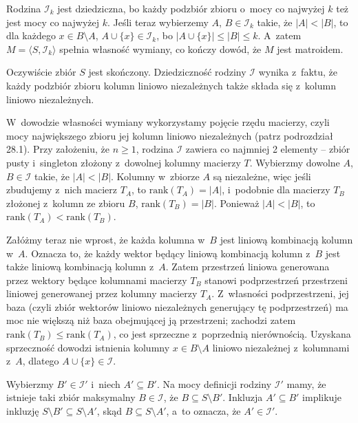 
\exercise %
Rodzina $\mathcal{I}_k$ jest dziedziczna, bo każdy podzbiór zbioru o~mocy co najwyżej $k$ też jest mocy co najwyżej $k$.
Jeśli teraz wybierzemy $A$, $B\in\mathcal{I}_k$ takie, że $|A|<|B|$, to dla każdego $x\in B\setminus A$, $A\cup\{x\}\in\mathcal{I}_k$, bo $|A\cup\{x\}|\le|B|\le k$.
A~zatem $M=\langle S,\mathcal{I}_k\rangle$ spełnia własność wymiany, co kończy dowód, że $M$ jest matroidem.

\exercise %

\noindent Oczywiście zbiór $S$ jest skończony.
Dziedziczność rodziny $\mathcal{I}$ wynika z~faktu, że każdy podzbiór zbioru kolumn liniowo niezależnych także składa się z~kolumn liniowo niezależnych.

W~dowodzie własności wymiany wykorzystamy pojęcie rzędu macierzy, czyli mocy największego zbioru jej kolumn liniowo niezależnych (patrz podrozdział 28.1).
Przy założeniu, że $n\ge1$, rodzina $\mathcal{I}$ zawiera co najmniej 2 elementy -- zbiór pusty i~singleton złożony z~dowolnej kolumny macierzy $T$.
Wybierzmy dowolne $A$, $B\in\mathcal{I}$ takie, że $|A|<|B|$.
Kolumny w~zbiorze $A$ są niezależne, więc jeśli zbudujemy z~nich macierz $T_A$, to $\mathrm{rank}(T_A)=|A|$, i~podobnie dla macierzy $T_B$ złożonej z~kolumn ze zbioru $B$, $\mathrm{rank}(T_B)=|B|$.
Ponieważ $|A|<|B|$, to $\mathrm{rank}(T_A)<\mathrm{rank}(T_B)$.

Załóżmy teraz nie wprost, że każda kolumna w~$B$ jest liniową kombinacją kolumn w~$A$.
Oznacza to, że każdy wektor będący liniową kombinacją kolumn z~$B$ jest także liniową kombinacją kolumn z~$A$.
Zatem przestrzeń liniowa generowana przez wektory będące kolumnami macierzy $T_B$ stanowi podprzestrzeń przestrzeni liniowej generowanej przez kolumny macierzy $T_A$.
Z~własności podprzestrzeni, jej baza (czyli zbiór wektorów liniowo niezależnych generujący tę podprzestrzeń) ma moc nie większą niż baza obejmującej ją przestrzeni; zachodzi zatem $\mathrm{rank}(T_B)\le\mathrm{rank}(T_A)$, co jest sprzeczne z~poprzednią nierównością.
Uzyskana sprzeczność dowodzi istnienia kolumny $x\in B\setminus A$ liniowo niezależnej z~kolumnami z~$A$, dlatego $A\cup\{x\}\in\mathcal{I}$.

\exercise %
Wybierzmy $B'\in\mathcal{I}'$ i~niech $A'\subseteq B'$.
Na mocy definicji rodziny $\mathcal{I}'$ mamy, że istnieje taki zbiór maksymalny $B\in\mathcal{I}$, że $B\subseteq S\setminus B'$.
Inkluzja $A'\subseteq B'$ implikuje inkluzję $S\setminus B'\subseteq S\setminus A'$, skąd $B\subseteq S\setminus A'$, a~to oznacza, że $A'\in\mathcal{I}'$.

